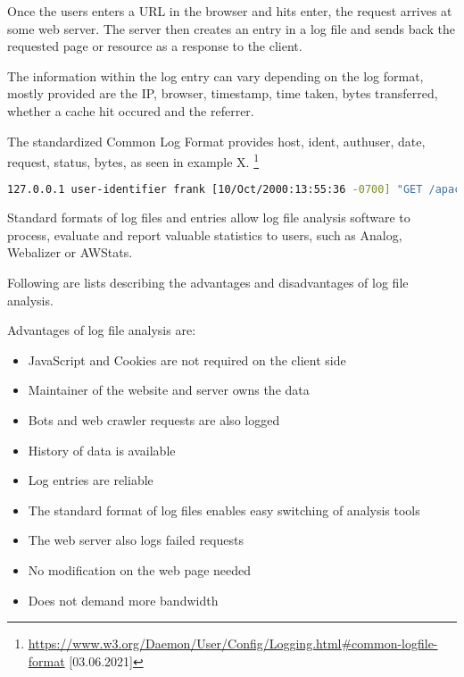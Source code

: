 Once the users enters a URL in the browser and hits enter, the request arrives at some web server.
The server then creates an entry in a log file and sends back the requested page or resource as a response to the client. %

The information within the log entry can vary depending on the log format, mostly provided are the IP, browser, timestamp, time taken, bytes transferred, whether a cache hit occured and the referrer. %

The standardized Common Log Format provides host, ident, authuser, date, request, status, bytes, as seen in example X. \footnote{\url{https://www.w3.org/Daemon/User/Config/Logging.html\#common-logfile-format} [03.06.2021]}

\begin{center}
\begin{lstlisting}[caption={Position 1}, language=bash, numbers=none, basicstyle=\tiny]
127.0.0.1 user-identifier frank [10/Oct/2000:13:55:36 -0700] "GET /apache_pb.gif HTTP/1.0" 200 2326
\end{lstlisting}
\end{center}

Standard formats of log files and entries allow log file analysis software to process, evaluate and report valuable statistics to users, such as Analog, Webalizer or AWStats. %


Following are lists describing the advantages and disadvantages of log file analysis.

Advantages of log file analysis are:

\begin{itemize}
\item JavaScript and Cookies are not required on the client side
\item Maintainer of the website and server owns the data %
\item Bots and web crawler requests are also logged %
\item History of data is available %
\item Log entries are reliable %
\item The standard format of log files enables easy switching of analysis tools %
\item The web server also logs failed requests %
\item No modification on the web page needed %
\item Does not demand more bandwidth %
\end{itemize}


